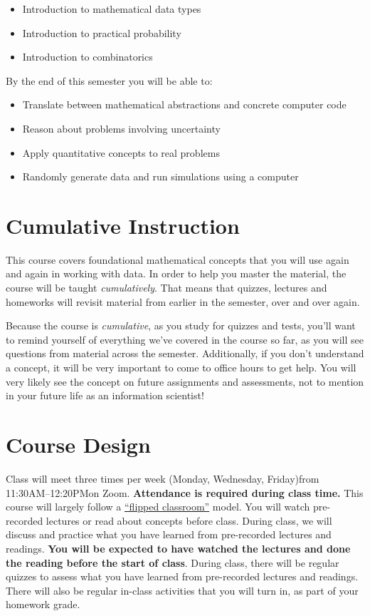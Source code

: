 \documentclass[10pt]{memoir}
\def\mymeetingdays{Monday, Wednesday, Friday}
\def\mymeetingtimes{11:30AM--12:20PM}
\begin{document}
\begin{itemize}
\item Introduction to mathematical data types
\item Introduction to practical probability
\item Introduction to combinatorics
\end{itemize}

By the end of this semester you will be able to:
\begin{itemize}
\item Translate between mathematical abstractions and concrete computer code
\item Reason about problems involving uncertainty
\item Apply quantitative concepts to real problems
\item Randomly generate data and run simulations using a computer
\end{itemize}

\section{\textbf{Cumulative Instruction}}

This course covers foundational mathematical concepts that you will use again and again in working with data. In order to help you master the material, the course will be taught \textit{cumulatively}. That means that quizzes, lectures and homeworks will revisit material from earlier in the semester, over and over again. 

Because the course is \textit{cumulative}, as you study for quizzes and tests, you'll want to remind yourself of everything we've covered in the course so far, as you will see questions from material across the semester. Additionally, if you don't understand a concept, it will be very important to come to office hours to get help. You will very likely see the concept on future assignments and assessments, not to mention in your future life as an information scientist!

\section{\textbf{Course Design}}
Class will meet three times per week (\mymeetingdays)\space from \mymeetingtimes\space on Zoom. \textbf{Attendance is required during class time.}  This course will largely follow a \href{https://en.wikipedia.org/wiki/Flipped_classroom}{``flipped classroom''}  model. You will watch pre-recorded lectures or read about concepts before class. During class, we will discuss and practice what you have learned from pre-recorded lectures and readings. \textbf{You will be expected to have watched the lectures and done the reading before the start of class}. During class, there will be regular quizzes to assess what you have learned from pre-recorded lectures and readings. There will also be regular in-class activities that you will turn in, as part of your homework grade.
\end{document}
